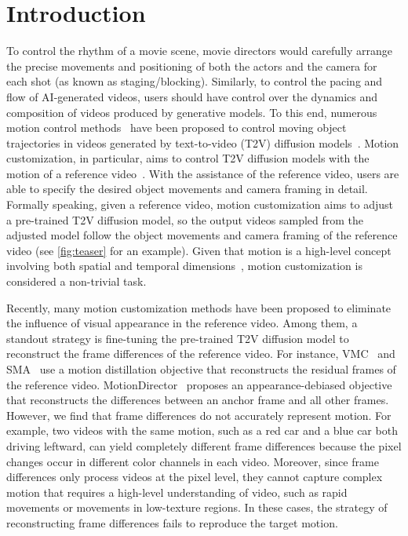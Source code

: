 \section{Introduction}
\label{sec:intro}

To control the rhythm of a movie scene, movie directors would carefully arrange the precise movements and positioning of both the actors and the camera for each shot (as known as staging/blocking). Similarly, to control the pacing and flow of AI-generated videos, users should have control over the dynamics and composition of videos produced by generative models. To this end, numerous motion control methods~\cite{dragnuwa, mctrl, draga, mb, trailblazer, peekaboo, boximator} have been proposed to control moving object trajectories in videos generated by text-to-video (T2V) diffusion models~\cite{vdm, vldm}. Motion customization, in particular, aims to control T2V diffusion models with the motion of a reference video~\cite{mc, md, vmc, dmt, sma}. With the assistance of the reference video, users are able to specify the desired object movements and camera framing in detail. Formally speaking, given a reference video, motion customization aims to adjust a pre-trained T2V diffusion model, so the output videos sampled from the adjusted model follow the object movements and camera framing of the reference video (see \cref{fig:teaser} for an example). Given that motion is a high-level concept involving both spatial and temporal dimensions~\cite{moft, dmt}, motion customization is considered a non-trivial task.

Recently, many motion customization methods have been proposed to eliminate the influence of visual appearance in the reference video. Among them, a standout strategy is fine-tuning the pre-trained T2V diffusion model to reconstruct the frame differences of the reference video. For instance, VMC~\cite{vmc} and SMA~\cite{sma} use a motion distillation objective that reconstructs the residual frames of the reference video. MotionDirector~\cite{md} proposes an appearance-debiased objective that reconstructs the differences between an anchor frame and all other frames. However, we find that frame differences do not accurately represent motion. For example, two videos with the same motion, such as a red car and a blue car both driving leftward, can yield completely different frame differences because the pixel changes occur in different color channels in each video. Moreover, since frame differences only process videos at the pixel level, they cannot capture complex motion that requires a high-level understanding of video, such as rapid movements or movements in low-texture regions. In these cases, the strategy of reconstructing frame differences fails to reproduce the target motion.

